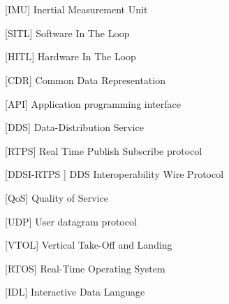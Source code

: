 \cleardoublepage
\chapter*{\listofabbrevname}
{}

\begin{acronym}[KolikMista]

		[IMU]
		{Inertial Measurement Unit}
		
		[SITL]
		{Software In The Loop}
		
		[HITL]
		{Hardware In The Loop}
		
		[CDR]
		{Common Data Representation}
		
		[API]
		{Application programming interface}

		[DDS\textsuperscript \textregistered ]
		{Data-Distribution Service\textsuperscript \textregistered}
		
		[RTPS]
		{Real Time Publish Subscribe protocol}
		
	    [DDSI-RTPS\textsuperscript{\texttrademark} ]
	    {DDS Interoperability Wire Protocol\textsuperscript{\texttrademark}}
		
		[QoS]
		{Quality of Service}
		
		[UDP]
		{User datagram protocol}
		
		[VTOL]
		{Vertical Take-Off and Landing}
		
		[RTOS]
		{Real-Time Operating System}
		
		[IDL]
		{Interactive Data Language}
		
\end{acronym}
